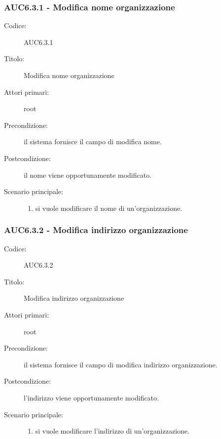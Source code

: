 \documentclass[casi-duso]{subfiles}
\begin{document}
\subsubsection{AUC6.3.1 - Modifica nome organizzazione}%
\label{subsub:AUC6.3.1}
\begin{description}
  \item[Codice:] AUC6.3.1
  \item[Titolo:] Modifica nome organizzazione
  \item[Attori primari:] root
  \item[Precondizione:] il sistema fornisce il campo di modifica nome.
  \item[Postcondizione:] il nome viene opportunamente modificato.
  \item[Scenario principale:]
  \begin{enumerate}
    \item si vuole modificare il nome di un'organizzazione.
  \end{enumerate}
\end{description}

\subsubsection{AUC6.3.2 - Modifica indirizzo organizzazione}%
\label{subsub:AUC6.3.2}
\begin{description}
  \item[Codice:] AUC6.3.2
  \item[Titolo:] Modifica indirizzo organizzazione
  \item[Attori primari:] root
  \item[Precondizione:] il sistema fornisce il campo di modifica indirizzo organizzazione.
  \item[Postcondizione:] l'indirizzo viene opportunamente modificato.
  \item[Scenario principale:]
  \begin{enumerate}
    \item si vuole modificare l'indirizzo di un'organizzazione.
  \end{enumerate}
\end{description}
\end{document}
